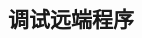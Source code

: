 \documentclass[class=book, crop=false]{standalone}
\begin{document}
\begin{CJK}{UTF8}{gbsn}

\chapter{调试远端程序}













\cleardoublepage

\end{CJK}
\end{document}
